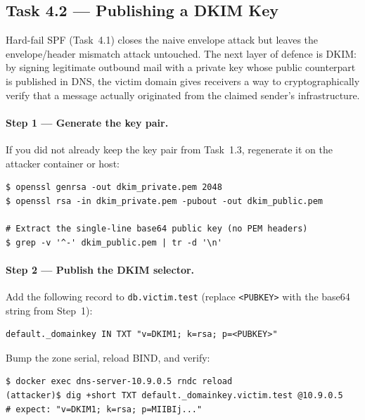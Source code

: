 \documentclass[11pt]{article}
\begin{document}
\subsection{Task 4.2 --- Publishing a DKIM Key}

Hard-fail SPF (Task~4.1) closes the naive envelope attack but leaves
the envelope/header mismatch attack untouched. The next layer of
defence is DKIM: by signing legitimate outbound mail with a private
key whose public counterpart is published in DNS, the victim domain
gives receivers a way to cryptographically verify that a message
actually originated from the claimed sender's infrastructure.

\paragraph{Step 1 --- Generate the key pair.}
If you did not already keep the key pair from Task~1.3, regenerate it
on the attacker container or host:

\begin{listing}[H]
\begin{verbatim}
$ openssl genrsa -out dkim_private.pem 2048
$ openssl rsa -in dkim_private.pem -pubout -out dkim_public.pem

# Extract the single-line base64 public key (no PEM headers)
$ grep -v '^-' dkim_public.pem | tr -d '\n'
\end{verbatim}
\end{listing}

\paragraph{Step 2 --- Publish the DKIM selector.}
Add the following record to \texttt{db.victim.test} (replace
\texttt{<PUBKEY>} with the base64 string from Step~1):

\begin{listing}[H]
\begin{verbatim}
default._domainkey IN TXT "v=DKIM1; k=rsa; p=<PUBKEY>"
\end{verbatim}
\end{listing}

Bump the zone serial, reload BIND, and verify:

\begin{listing}[H]
\begin{verbatim}
$ docker exec dns-server-10.9.0.5 rndc reload
(attacker)$ dig +short TXT default._domainkey.victim.test @10.9.0.5
# expect: "v=DKIM1; k=rsa; p=MIIBIj..."
\end{verbatim}
\end{listing}
\end{document}

